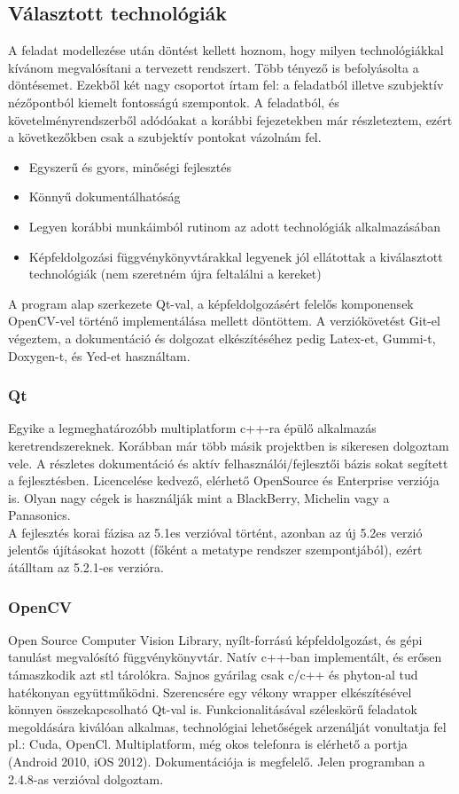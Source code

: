\documentclass[a4paper,12pt,oneside]{report}
\begin{document}
\subsection{Választott technológiák}
A feladat modellezése után döntést kellett hoznom, hogy milyen technológiákkal kívánom megvalósítani a tervezett rendszert. Több tényező is befolyásolta a döntésemet. Ezekből két nagy csoportot írtam fel: a feladatból illetve szubjektív nézőpontból kiemelt fontosságú szempontok. A feladatból, és követelményrendszerből adódóakat a korábbi fejezetekben már részleteztem, ezért a következőkben csak a szubjektív pontokat vázolnám fel.
\begin{itemize}
	\itemsep0em
	\item Egyszerű és gyors, minőségi fejlesztés
	\item Könnyű dokumentálhatóság
	\item Legyen korábbi munkáimból rutinom az adott technológiák alkalmazásában
	\item Képfeldolgozási függvénykönyvtárakkal legyenek jól ellátottak a kiválasztott technológiák (nem szeretném újra feltalálni a kereket)
\end{itemize}
A program alap szerkezete Qt-val, a képfeldolgozásért felelős komponensek OpenCV-vel történő implementálása mellett döntöttem. A verziókövetést Git-el végeztem, a dokumentáció és dolgozat elkészítéséhez pedig Latex-et, Gummi-t, Doxygen-t, és Yed-et használtam.
\subsubsection{Qt}
Egyike a legmeghatározóbb\cite{website:qt_1_million} multiplatform c++-ra épülő alkalmazás keretrendszereknek. \cite{website:qt_about} Korábban már több másik projektben is sikeresen dolgoztam vele. A részletes dokumentáció és aktív felhasználói/fejlesztői bázis sokat segített a fejlesztésben. \cite{website:qt_dochome} \cite{website:qt_docforum}\cite{website:qt_docmaillist} Licencelése kedvező, elérhető OpenSource és Enterprise verziója is. Olyan nagy cégek is használják mint a BlackBerry, Michelin vagy a Panasonics.\cite{website:qt_in_use} \\ A fejlesztés korai fázisa az 5.1es verzióval történt, azonban az új 5.2es verzió jelentős újításokat hozott (főként a metatype rendszer szempontjából), ezért átálltam az 5.2.1-es verzióra.


\subsubsection{OpenCV}	
Open Source Computer Vision Library, nyílt-forrású képfeldolgozást, és gépi tanulást megvalósító függvénykönyvtár.\cite{website:opencv_about} Natív c++-ban implementált, és erősen támaszkodik azt stl tárolókra. Sajnos gyárilag csak c/c++ és phyton-al tud hatékonyan együttműködni. Szerencsére egy vékony wrapper elkészítésével könnyen összekapcsolható Qt-val is. Funkcionalitásával széleskörű feladatok megoldására kiválóan alkalmas, technológiai lehetőségek arzenálját vonultatja fel pl.: Cuda, OpenCl. Multiplatform, még okos telefonra is elérhető a portja (Android 2010, iOS 2012). Dokumentációja is megfelelő. Jelen programban a 2.4.8-as verzióval dolgoztam.
\end{document}
